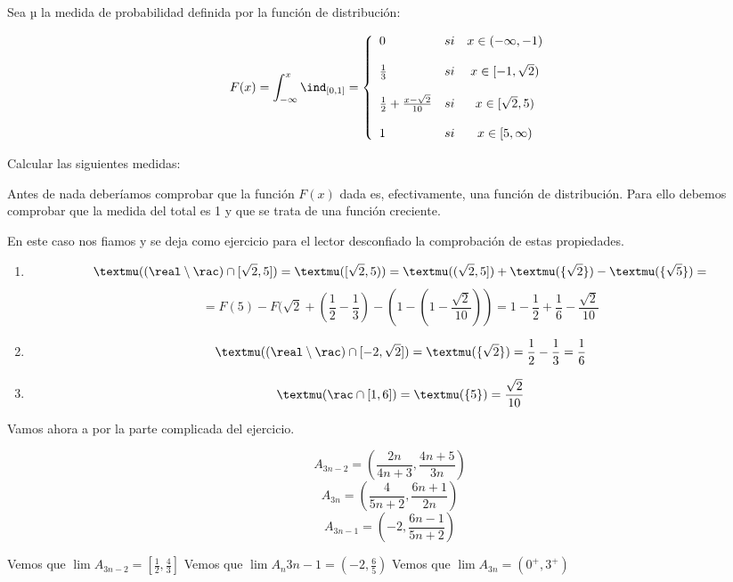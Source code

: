 \begin{problem}
Sea µ la medida de probabilidad definida por la función de distribución:

\[F(x)= \int_{-\infty}^{x} \ind_{[0,1]} = \left\{ \begin{array}{lcc}
             0 &   si  & x \in (- \infty, -1) \\
             \\ \frac{1}{3} & si &  x \in [-1, \sqrt{2}) \\
             \\ \frac{1}{2} + \frac{x-\sqrt{2}}{10} & si &  x \in [\sqrt{2}, 5) \\
             \\ 1 &  si  & x \in [5, \infty)
             \end{array}
   \right.\]

Calcular las siguientes medidas:
\solution

Antes de nada deberíamos comprobar que la función $F(x)$ dada es, efectivamente, una función de distribución. Para ello debemos comprobar que la medida del total es 1 y que se trata de una función creciente.

En este caso nos fiamos y se deja como ejercicio para el lector desconfiado la comprobación de estas propiedades.
\newpage
\begin{enumerate}
\item \[µ((\real \setminus \rac)\cap[\sqrt{2}, 5]) = µ([\sqrt{2}, 5)) = µ((\sqrt{2}, 5]) + µ (\{\sqrt{2}\}) - µ (\{\sqrt{5}\}) =\]
\[ = F(5) - F(\sqrt{2} +(\frac{1}{2}-\frac{1}{3}) -(1-(1-\frac{\sqrt{2}}{10}))=1-\frac{1}{2}+\frac{1}{6}-\frac{\sqrt{2}}{10}\]

\item \[µ((\real \setminus \rac)\cap [-2, \sqrt{2}]) = µ(\{\sqrt{2}\}) = \frac{1}{2}-\frac{1}{3} = \frac{1}{6}\]

\item \[µ(\rac \cap [1,6]) = µ(\{5\}) = \frac{\sqrt{2}}{10}\]
\end{enumerate}

Vamos ahora a por la parte complicada del ejercicio.

\[A_{3n-2} = \left(\frac{2n}{4n+3}, \frac{4n+5}{3n}\right)\]
\[A_{3n} = \left(\frac{4}{5n+2}, \frac{6n+1}{2n}\right)\]
\[A_{3n-1} = \left(-2, \frac{6n-1}{5n+2}\right)\]


Vemos que $\lim A_{3n-2}= [\frac{1}{2}, \frac{4}{3}]$
Vemos que $\lim A_n{3n-1} = (-2, \frac{6}{5})$
Vemos que $\lim A_{3n} = (0^+, 3^+)$


\end{problem}
